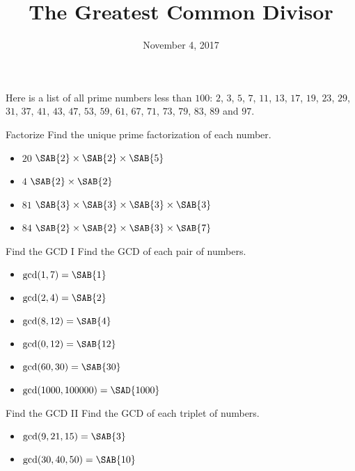 \documentclass[12pt,letterpaper]{article}
\title{The Greatest Common Divisor}
\date{November 4, 2017}
\begin{document}
\maketitle

\thispagestyle{empty}

Here is a list of all prime numbers less than $100$: $2$, $3$, $5$, $7$, $11$,
$13$, $17$, $19$, $23$, $29$, $31$, $37$, $41$, $43$, $47$, $53$, $59$, $61$,
$67$, $71$, $73$, $79$, $83$, $89$ and $97$.

\begin{problem}{Factorize}
 Find the unique prime factorization of each number.

 \begin{itemize}
  \item $20$ \hfill $\SAB{2} \times \SAB{2} \times \SAB{5}$
  \item $4$ \hfill $\SAB{2} \times \SAB{2}$
  \item $81$ \hfill $\SAB{3} \times \SAB{3} \times \SAB{3} \times \SAB{3}$
  \item $84$ \hfill $\SAB{2} \times \SAB{2} \times \SAB{3} \times \SAB{7}$
 \end{itemize}
\end{problem}

\begin{problem}{Find the GCD I}
 Find the GCD of each pair of numbers.

 \begin{itemize}
  \item $\gcd(1, 7) = \SAB{1}$
  \item $\gcd(2, 4) = \SAB{2}$
  \item $\gcd(8, 12) = \SAB{4}$
  \item $\gcd(0, 12) = \SAB{12}$
  \item $\gcd(60, 30) = \SAB{30}$
  \item $\gcd(1000, 100000) = \SAD{1000}$
 \end{itemize}
\end{problem}

\begin{problem}{Find the GCD II}
 Find the GCD of each triplet of numbers.

 \begin{itemize}
  \item $\gcd(9, 21, 15) = \SAB{3}$
  \item $\gcd(30, 40, 50) = \SAB{10}$
 \end{itemize}
\end{problem}
\end{document}
